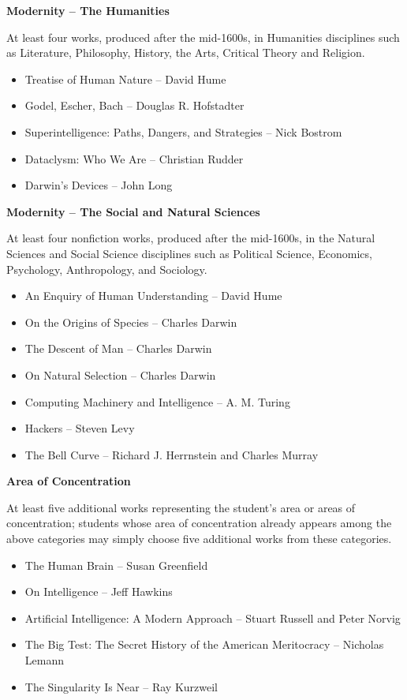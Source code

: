 \documentclass[11pt]{article}
\begin{document}
\par \textbf{Modernity -- The Humanities}
\par At least four works, produced after the mid-1600s, in Humanities disciplines such as Literature, Philosophy, History, the Arts, Critical Theory and Religion.
\begin{itemize}
	\item Treatise of Human Nature -- David Hume
	\item Godel, Escher, Bach -- Douglas R. Hofstadter
	\item Superintelligence: Paths, Dangers, and Strategies -- Nick Bostrom
	\item Dataclysm: Who We Are -- Christian Rudder
	\item Darwin's Devices -- John Long
\end{itemize}

\par \textbf{Modernity -- The Social and Natural Sciences}
\par At least four nonfiction works, produced after the mid-1600s, in the Natural Sciences and Social Science disciplines such as Political Science, Economics, Psychology, Anthropology, and Sociology.
\begin{itemize}
	\item An Enquiry of Human Understanding -- David Hume
	\item On the Origins of Species -- Charles Darwin
	\item The Descent of Man -- Charles Darwin
	\item On Natural Selection -- Charles Darwin
	\item Computing Machinery and Intelligence -- A. M. Turing
	\item Hackers -- Steven Levy
	\item The Bell Curve -- Richard J. Herrnstein and Charles Murray
\end{itemize}

\par \textbf{Area of Concentration}
\par At least five additional works representing the student's area or areas of concentration; students whose area of concentration already appears among the above categories may simply choose five additional works from these categories.
\begin{itemize}
	\item The Human Brain -- Susan Greenfield
	\item On Intelligence -- Jeff Hawkins
	\item Artificial Intelligence: A Modern Approach -- Stuart Russell and Peter Norvig
	\item The Big Test: The Secret History of the American Meritocracy -- Nicholas Lemann
	\item The Singularity Is Near -- Ray Kurzweil
\end{itemize}
\end{document}
